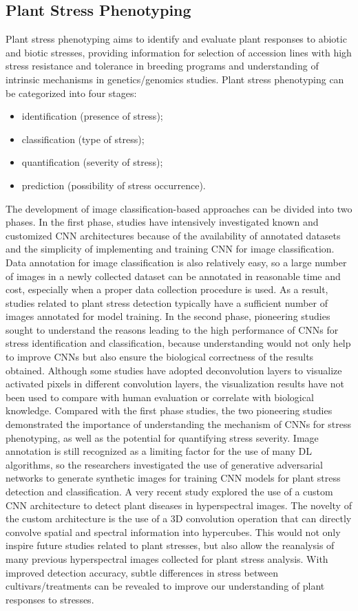 \subsection{Plant Stress Phenotyping}
Plant stress phenotyping aims to identify and evaluate plant responses to abiotic and biotic stresses, providing information for selection of accession lines
with high stress resistance and tolerance in breeding programs and understanding of intrinsic mechanisms in genetics/genomics studies.
Plant stress phenotyping can be categorized into four stages:
\begin{itemize}
\item identification (presence of stress);
\item classification (type of stress); 
\item quantification (severity of stress);
\item prediction (possibility of stress occurrence).
\end{itemize}
The development of image classification-based approaches can be divided into two phases. In the first phase, studies have intensively investigated known
and customized CNN architectures because of the availability of annotated datasets and the simplicity of implementing and training CNN for image classification.
Data annotation for image classification is also relatively easy, so a large number of images in a newly collected dataset can be annotated in reasonable time and
cost, especially when a proper data collection procedure is used. As a result, studies related to plant stress detection typically have a sufficient number of
images annotated for model training. In the second phase, pioneering studies sought to understand the reasons leading to the high performance of CNNs for stress
identification and classification, because understanding would not only help to improve CNNs but also ensure the biological correctness of the results obtained.
Although some studies have adopted deconvolution layers to visualize activated pixels in different convolution layers, the visualization results have not been
used to compare with human evaluation or correlate with biological knowledge. Compared with the first phase studies, the two pioneering studies demonstrated the importance of
understanding the mechanism of CNNs for stress phenotyping, as well as the potential for quantifying stress severity. Image annotation is still recognized as a limiting factor
for the use of many DL algorithms, so the researchers investigated the use of generative adversarial networks to generate synthetic images for training CNN models for
plant stress detection and classification. A very recent study explored the use of a custom CNN architecture to detect plant diseases in hyperspectral images.
The novelty of the custom architecture is the use of a 3D convolution operation that can directly convolve spatial and spectral information into hypercubes.
This would not only inspire future studies related to plant stresses, but also allow the reanalysis of many previous hyperspectral images collected for plant
stress analysis. With improved detection accuracy, subtle differences in stress between cultivars/treatments can be revealed to improve our understanding of plant
responses to stresses.

